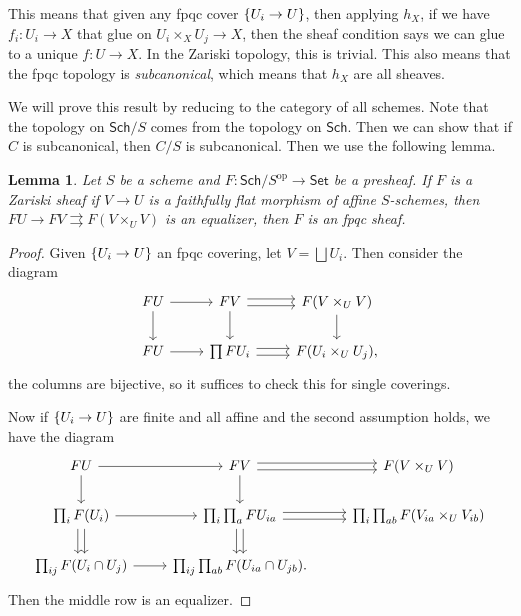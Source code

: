 \documentclass[leqno, openany]{memoir}
\newtheorem{lem}[thm]{Lemma}
\theoremstyle{definition}
\theoremstyle{remark}
\theoremstyle{plain}
\theoremstyle{definition}
\theoremstyle{remark}
\newcommand{\mr}[1]{\mathrm{#1}}
\newcommand{\ms}[1]{\mathsf{#1}}
\begin{document}
This means that given any fpqc cover $\qty{U_i \to U}$, then applying $h_X$, if
we have $f_i \colon U_i \to X$ that glue on $U_i \times_X U_j \to X$, then the
sheaf condition says we can glue to a unique $f \colon U \to X$. In the Zariski
topology, this is trivial. This also means that the fpqc topology is
\textit{subcanonical}, which means that $h_X$ are all sheaves.

    We will prove this result by reducing to the category of all schemes. Note
    that the topology on $\ms{Sch}/S$ comes from the topology on $\ms{Sch}$.
    Then we can show that if $C$ is subcanonical, then $C/S$ is subcanonical.
    Then we use the following lemma.

\begin{lem} Let $S$ be a scheme and $F \colon \ms{Sch}/S^{\mr{op}} \to
    \ms{Set}$ be a presheaf. If $F$ is a Zariski sheaf if $V \to U$ is a
    faithfully flat morphism of affine $S$-schemes, then $FU \to FV
    \rightrightarrows F(V \times_U V)$ is an equalizer, then $F$ is an fpqc
    sheaf.  \end{lem}

\begin{proof} Given $\qty{U_i \to U}$ an fpqc covering, let $V = \bigsqcup
    U_i$. Then consider the diagram \begin{equation*} \begin{tikzcd} FU
        \arrow{r} \arrow{d} & FV \arrow[shift left=1]{r} \arrow[shift
        right=1]{r} \arrow{d} & F(V \times_U V) \arrow{d} \\ FU \arrow{r} &
    \prod FU_i \arrow[shift left=1]{r} \arrow[shift right=1]{r} & F(U_i
\times_U U_j), \end{tikzcd} \end{equation*} the columns are bijective, so it
suffices to check this for single coverings.   

    Now if $\qty{U_i \to U}$ are finite and all affine and the second
    assumption holds, we have the diagram \begin{equation*} \begin{tikzcd} FU
        \arrow{r} \arrow{d} & FV \arrow{d} \arrow[shift left=1]{r} \arrow[shift
        right = 1]{r} & F(V \times_U V) \\ \prod_i F(U_i) \arrow{r}
        \arrow[shift left=1]{d} \arrow[shift right = 1]{d} & \prod_i \prod_a
        FU_{ia} \arrow[shift left=1]{r} \arrow[shift right = 1]{r}\arrow[shift
        left=1]{d} \arrow[shift right = 1]{d} & \prod_i \prod_{ab} F(V_{ia}
        \times_U V_{ib}) \\ \prod_{ij} F(U_i \cap U_j) \arrow{r} & \prod_{ij}
    \prod_{ab} F(U_{ia} \cap U_{jb}).  \end{tikzcd} \end{equation*} Then the
middle row is an equalizer.  \end{proof}
\end{document}
